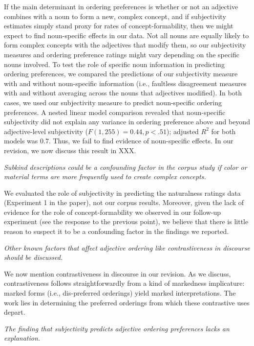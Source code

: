 \documentclass[12pt]{article}
\begin{document}
If the main determinant in ordering preferences is whether or not an adjective combines with a noun to form a new, complex concept, and if subjectivity estimates simply stand proxy for rates of concept-formability, then we might expect to find noun-specific effects in our data. Not all nouns are equally likely to form complex concepts with the adjectives that modify them, so our subjectivity measures and ordering preference ratings might vary depending on the specific nouns involved. To test the role of specific noun information in predicting ordering preferences, we compared the predictions of our subjectivity measure with and without noun-specific information (i.e., faultless disagreement measures with and without averaging across the nouns that adjectives modified). In both cases, we used our subjectivity measure to predict noun-specific ordering preferences. A nested linear model comparison revealed that noun-specific subjectivity did not explain any variance in ordering preference above and beyond adjective-level subjectivity ($F(1,255) = 0.44, p < .51$); adjusted $R^2$ for both models was $0.7$. Thus, we fail to find evidence of noun-specific effects. In our revision, we now discuss this result in XXX.


\item  \emph{Subkind descriptions could be a confounding factor in the corpus study if color or material terms are more frequently used to create complex concepts.}

We evaluated the role of subjectivity in predicting the naturalness ratings data (Experiment 1 in the paper), not our corpus results. Moreover, given the lack of evidence for the role of concept-formability we observed in our follow-up experiment (see the response to the previous point), we believe that there is little reason to suspect it to be a confounding factor in the findings we reported. 



\item \emph{Other known factors that affect adjective ordering like contrastiveness in discourse should be discussed.}

We now mention contrastiveness in discourse in our revision. As we discuss, contrastiveness follows straightforwardly from a kind of markedness implicature: marked forms (i.e., dis-preferred orderings) yield marked interpretations. The work lies in determining the preferred orderings from which these contrastive uses depart.


\item \emph{The finding that subjectivity predicts adjective ordering preferences lacks an explanation.}
\end{document}
